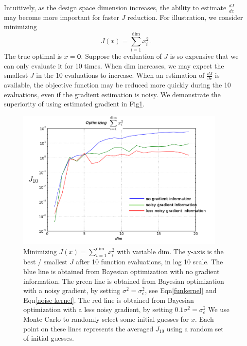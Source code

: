 \documentclass[a4paper,onecolumn]{article}
\theoremstyle{remark}
\begin{document}
\noindent Intuitively, as the design space dimension increases, the ability to estimate 
$\frac{dJ}{dc}$ may become more important for faster $J$ reduction. 
For illustration, we consider minimizing
\begin{equation}
    J(x) = \sum_{i=1}^{\textrm{dim}} x_i^2\,.
\end{equation}
The true optimal is $x=\mathbf{0}$. Suppose the evaluation of $J$ is so expensive
that we can only evaluate it for 10 times. When $\textrm{dim}$ increases, we may expect
the smallest $J$ in the 10 evaluations to increase. When an estimation of $\frac{dJ}{dc}$
is available, the objective function may be reduced more quickly during the 10 evaluations,
even if the gradient estimation is noisy. We demonstrate  the superiority of using 
estimated gradient in Fig\ref{fig: dim and J}.
\begin{figure}[H]
    \begin{center}
        \includegraphics[height=7cm]{highdimoptdemon.png}
        \caption{Minimizing $J(x) = \sum_{i=1}^{\textrm{dim}}x_i^2$ with variable $\textrm{dim}$.
                 The y-axis is the best / smallest $J$ after 10 function evaluations, in log 10 scale.
                 The blue line is obtained from Bayesian optimization with no gradient information.
                 The green line is obtained from Bayesian optimization with a noisy gradient, by
                 setting $\sigma^2 = \sigma^2_\epsilon$, see Eqn\eqref{funkernel} 
                 and Eqn\eqref{noise kernel}. The red line is obtained from Bayesian optimization
                 with a less noisy gradient, by setting $0.1 \sigma^2 = \sigma^2_\epsilon$
                 We use Monte Carlo to randomly select some initial guesses for $x$. Each point
                 on these lines represents the averaged $J_{10}$ using a random set of 
                 initial guesses.}
        \label{fig: dim and J}
    \end{center}
\end{figure}
\end{document}
